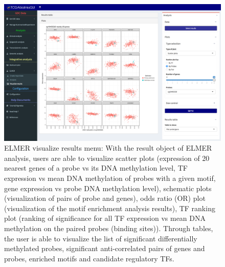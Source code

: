 \begin{figure}[h!]
\includegraphics[width=1.0\linewidth]{images/fig6-ELMER_results.png}
  \caption[TCGAbiolinksGUI: ELMER visualize results menu]{ELMER visualize results menu:
       With the result object of ELMER analysis, users are able to visualize scatter plots (expression of 20 nearest genes of a probe vs its DNA methylation level, TF expression vs mean DNA methylation of probes with a given motif, gene expression vs probe DNA methylation level), schematic plots (visualization of pairs of probe and genes), odds ratio (OR) plot (visualization of the motif enrichment analysis results), TF ranking plot (ranking of significance for all TF expression vs mean DNA methylation on the paired probes (binding sites)). Through tables, the user is able to visualize the list of significant differentially methylated probes,  significant anti-correlated pairs of genes and probes, enriched motifs and candidate regulatory TFs. }
  \label{fig:elmer_visualize}
   \end{figure}

